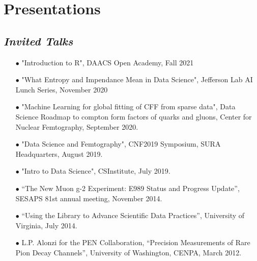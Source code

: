 \documentclass{article}[10pt]
\begin{document}
\section*{Presentations}

\subsection*{\emph{Invited Talks}}

\begin{itemize}
\item [$\bullet$] "Introduction to R", DAACS Open Academy, Fall 2021
\item [$\bullet$] "What Entropy and Impendance Mean in Data Science", Jefferson Lab AI Lunch Series, November 2020
\item [$\bullet$] "Machine Learning for global fitting of CFF from sparse data", Data Science Roadmap to compton form factors of quarks and gluons, Center for Nuclear Femtography, September 2020.
\item [$\bullet$] "Data Science and Femtography", CNF2019 Symposium, SURA Headquarters, August 2019.
\item [$\bullet$] "Intro to Data Science", CSInstitute, July 2019.
\item [$\bullet$] ``The New Muon g-2 Experiment: E989 Status and Progress Update'', SESAPS 81st annual meeting, November 2014.
\item [$\bullet$] ``Using the Library to Advance Scientific Data Practices'', University of Virginia, July 2014.
\item [$\bullet$] L.P. Alonzi for the PEN Collaboration, ``Precision Measurements of Rare Pion Decay Channels'', University of Washington, CENPA, March 2012.
\end{itemize}
\end{document}
